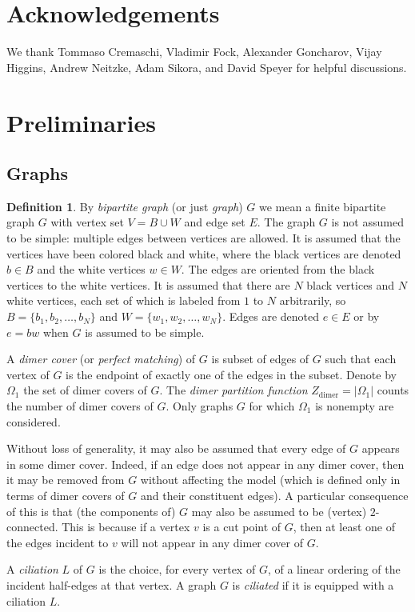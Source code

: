 \documentclass[12pt, reqno]{amsart}
\theoremstyle{definition}
\newtheorem{defi}[theo]{Definition}
\begin{document}
\section*{Acknowledgements}

We thank Tommaso Cremaschi, Vladimir Fock, Alexander Goncharov, Vijay Higgins, Andrew Neitzke, Adam Sikora, and David Speyer for helpful discussions.

\section{Preliminaries}
\label{sec:preliminaries}

\subsection{Graphs}

\begin{defi}\label{defi:graphassumptions}
By \emph{bipartite graph} (or just \emph{graph}) $G$ we mean a finite bipartite graph $G$ with vertex set $V=B\cup W$ and edge set $E$.  The graph $G$ is not assumed to be simple: multiple edges between vertices are allowed.  It is assumed that the vertices have been colored black and white, where the black vertices are denoted $b\in B$ and the white vertices $w\in W$.  The edges are oriented from the black vertices to the white vertices.  It is assumed that there are $N$ black vertices and $N$ white vertices, each set of which is labeled from $1$ to $N$ arbitrarily, so $B=\{b_1,b_2,\dots,b_N\}$ and $W=\{w_1,w_2,\dots,w_N\}$.  Edges are denoted $e\in E$ or by $e=bw$ when $G$ is assumed to be simple.  

A \emph{dimer cover} (or \emph{perfect matching}) of $G$ is subset of edges of $G$ such that each vertex of $G$ is the endpoint of exactly one of the edges in the subset.  Denote by $\Omega_1$ the set of dimer covers of $G$.  The \emph{dimer partition function} $Z_\mathrm{dimer}=|\Omega_1|$ counts the number of dimer covers of $G$.  Only graphs $G$ for which $\Omega_1$ is nonempty are considered.  

Without loss of generality, it may also be assumed that every edge of $G$ appears in some dimer cover.  Indeed, if an edge does not appear in any dimer cover, then it may be removed from $G$ without affecting the model (which is defined only in terms of dimer covers of $G$ and their constituent edges).  A particular consequence of this is that (the components of) $G$ may also be assumed to be (vertex) $2$-connected.  This is because if a vertex $v$ is a cut point of $G$, then at least one of the edges incident to $v$ will not appear in any dimer cover of $G$.  

A \emph{ciliation} $L$ of $G$ is the choice, for every vertex of $G$, of a linear ordering of the incident half-edges at that vertex.  A graph $G$ is \emph{ciliated} if it is equipped with a ciliation $L$.  
\end{defi}
\end{document}
